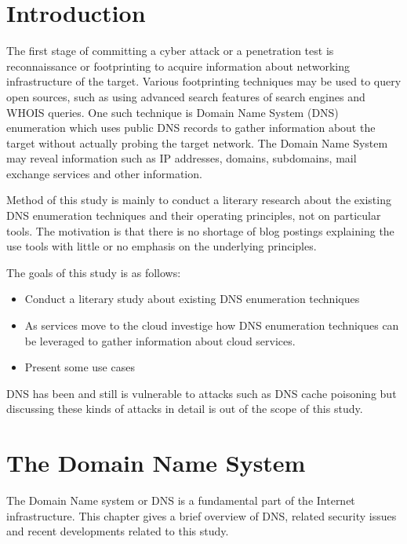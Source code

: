 
\section{Introduction}

The first stage of committing a cyber attack or a penetration test is reconnaissance or footprinting to acquire information about networking infrastructure of the target. Various footprinting techniques may be used to query open sources, such as using advanced search features of search engines and WHOIS queries. One such technique is Domain Name System (DNS) enumeration which uses public DNS records to gather information about the target without actually probing the target network. The Domain Name System may reveal information such as IP addresses, domains, subdomains, mail exchange services and other information. 

Method of this study is mainly to conduct a literary research about the existing DNS enumeration techniques and their operating principles, not on particular tools. The motivation is that there is no shortage of blog postings explaining the use tools with little or no emphasis on the underlying principles.

The goals of this study is as follows:

\begin{itemize}
 \item Conduct a literary study about existing DNS enumeration techniques
 \item As services move to the cloud investige how DNS enumeration techniques can be leveraged to 
 gather information about cloud services.
 \item Present some use cases
\end{itemize}



DNS has been and still is vulnerable to attacks such as DNS cache poisoning but discussing these kinds of attacks in detail is out of the scope of this study.



\section{The Domain Name System}

The Domain Name system or DNS is a fundamental part of the Internet infrastructure. This chapter gives a brief overview of DNS, related security issues and recent developments related to this study.


